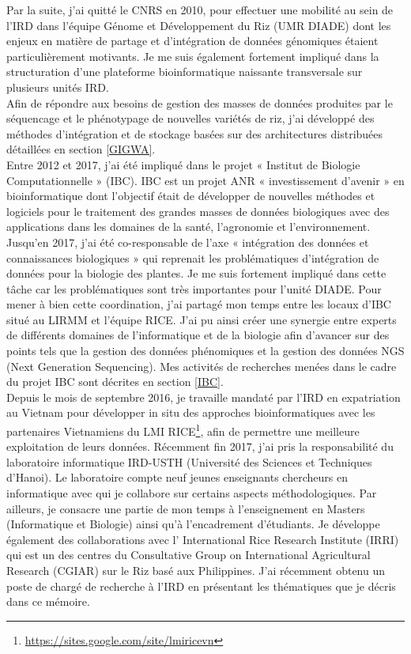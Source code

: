 Par la suite, j’ai quitté le CNRS en 2010, pour effectuer une mobilité au sein de l’IRD dans l’équipe Génome et Développement du Riz (UMR DIADE) dont les enjeux en matière de partage et d’intégration de données génomiques étaient particulièrement motivants. Je me suis également fortement impliqué dans la structuration d’une plateforme bioinformatique naissante transversale sur plusieurs unités IRD. \\
Afin de répondre aux besoins de gestion des masses de données produites par le séquencage et le phénotypage de nouvelles variétés de riz, j’ai développé des méthodes d’intégration et de stockage basées sur des architectures distribuées détaillées en section \ref{GIGWA}. \\
Entre 2012 et 2017, j'ai été impliqué dans le projet « Institut de Biologie Computationnelle » (IBC). IBC est un projet ANR « investissement d’avenir » en bioinformatique dont l’objectif était de développer de nouvelles méthodes et logiciels pour le traitement des grandes masses de données biologiques avec des applications dans les domaines de la santé, l’agronomie et l’environnement. 
Jusqu'en 2017, j'ai été co-responsable de l’axe « intégration des données et connaissances biologiques » qui reprenait les problématiques d’intégration de données pour la biologie des plantes. Je me suis fortement impliqué dans cette tâche car les problématiques sont très importantes pour l’unité DIADE. Pour mener à bien cette coordination, j’ai partagé mon temps entre les locaux d’IBC situé au LIRMM et l’équipe RICE. J’ai pu ainsi créer une synergie entre experts de différents domaines de l’informatique et de la biologie afin d’avancer sur des points tels que la gestion des données phénomiques et la gestion des données NGS (Next Generation Sequencing). Mes activités de recherches menées dans le cadre du projet IBC sont décrites en section \ref{IBC}. \\
Depuis le mois de septembre 2016, je travaille mandaté par l'IRD en expatriation au Vietnam pour développer in situ des approches bioinformatiques avec les partenaires Vietnamiens du LMI RICE\footnote{\url{https://sites.google.com/site/lmiricevn}}, afin de permettre une meilleure exploitation de leurs données. Récemment fin 2017, j’ai pris la responsabilité du laboratoire informatique IRD-USTH (Université des Sciences et Techniques d’Hanoi). Le laboratoire compte neuf jeunes enseignants chercheurs en informatique avec qui je collabore sur certains aspects méthodologiques. Par ailleurs, je consacre une partie de mon temps à l’enseignement en Masters (Informatique et Biologie) ainsi qu’à l’encadrement d’étudiants. Je développe également des collaborations avec l’ International Rice Research Institute (IRRI) qui est un des centres du Consultative Group on International Agricultural Research (CGIAR) sur le Riz basé aux Philippines.
J'ai récemment obtenu un poste de chargé de recherche à l'IRD en présentant les thématiques que je décris dans ce mémoire. \\

